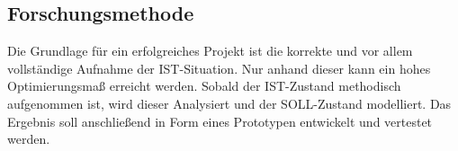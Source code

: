 \documentclass[12pt]{article}
\begin{document}
\subsection{Forschungsmethode}
Die Grundlage für ein erfolgreiches Projekt ist die korrekte und vor allem vollständige Aufnahme der IST-Situation. Nur anhand dieser kann ein hohes Optimierungsmaß erreicht werden. Sobald der IST-Zustand methodisch aufgenommen ist, wird dieser Analysiert und der SOLL-Zustand modelliert. Das Ergebnis soll anschließend in Form eines Prototypen entwickelt und vertestet werden.   

















	\newpage

\setcounter{page}{4}




\end{document}
